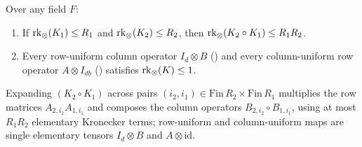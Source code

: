 \begin{lemma}\label{lem:osr-submult}
Over any field $F$:
\begin{enumerate}[label=(\alph*)]
\item If $\operatorname{rk}_{\otimes}(K_1) \le R_1$ and $\operatorname{rk}_{\otimes}(K_2) \le R_2$, then $\operatorname{rk}_{\otimes}(K_2 \circ K_1) \le R_1 R_2$.
\item Every row-uniform column operator $I_d \otimes B$ () and every
  column-uniform row operator $A \otimes I_{db}$ () satisfies
  $\operatorname{rk}_{\otimes}(K) \le 1$.
\end{enumerate}
\end{lemma}
\begin{outline}
Expanding $(K_2 \circ K_1)$ across pairs $(i_2, i_1) \in \mathrm{Fin}\,R_2 \times \mathrm{Fin}\,R_1$
multiplies the row matrices $A_{2,i_2} A_{1,i_1}$ and composes the column operators
$B_{2,i_2} \circ B_{1,i_1}$, using at most $R_1 R_2$ elementary Kronecker terms; row-uniform and
column-uniform maps are single elementary tensors $I_d \otimes B$ and $A \otimes \mathrm{id}$.
\end{outline}

